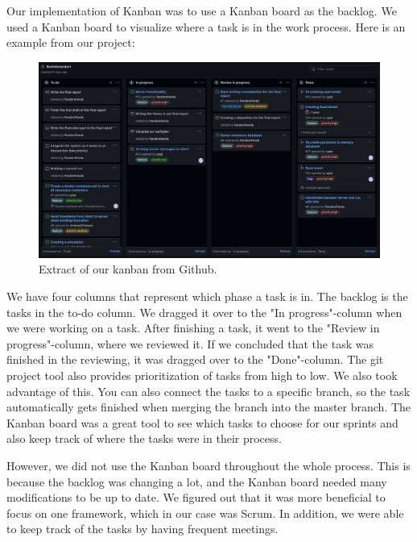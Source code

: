 Our implementation of Kanban was to use a Kanban board as the backlog. We used a Kanban board to visualize where a task is in the work process. Here is an example from our project:

\begin{figure}[h!]
	\centering
	\includegraphics[width=1\linewidth]{figures/kanban_screenshot}
	\caption[kanban screenshot]{Extract of our kanban from Github.}
	\label{fig:kanbanscreenshot}
\end{figure}

We have four columns that represent which phase a task is in. The backlog is the tasks in the to-do column. We dragged it over to the "In progress"-column when we were working on a task. After finishing a task, it went to the "Review in progress"-column, where we reviewed it. If we concluded that the task was finished in the reviewing, it was dragged over to the "Done"-column. The git project tool also provides prioritization of tasks from high to low. We also took advantage of this. You can also connect the tasks to a specific branch, so the task automatically gets finished when merging the branch into the master branch. The Kanban board was a great tool to see which tasks to choose for our sprints and also keep track of where the tasks were in their process.

However, we did not use the Kanban board throughout the whole process. This is because the backlog was changing a lot, and the Kanban board needed many modifications to be up to date. We figured out that it was more beneficial to focus on one framework, which in our case was Scrum. In addition, we were able to keep track of the tasks by having frequent meetings. 